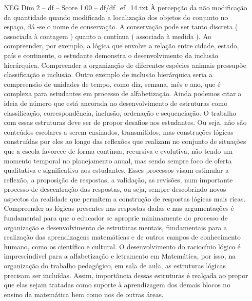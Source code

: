 \begin{textsample}{NEG Dim 2 – df – Score 1.00 – df/df\_ef\_14.txt}
À percepção da não modificação da quantidade quando modificada a localização dos objetos do conjunto no espaço, dá -se o nome de conservação.
A conservação pode ser tanto discreta ( associada à contagem ) quanto a contínua ( associada à medida ).
Ao compreender, por exemplo, a lógica que envolve a relação entre cidade, estado, país e continente, o estudante demonstra o desenvolvimento da inclusão hierárquica.
Compreender a organização de diferentes espécies animais pressupõe classificação e inclusão.
Outro exemplo de inclusão hierárquica seria a compreensão de unidades de tempo, como dia, semana, mês e ano, que é complexa para estudantes em processo de alfabetização.
Ainda podemos citar a ideia de número que está ancorada no desenvolvimento de estruturas como classificação, correspondência, inclusão, ordenação e sequenciação.
O trabalho com essas estruturas deve ser de propor desafios aos estudantes.
Ou seja, não são conteúdos escolares a serem ensinados, transmitidos, mas construções lógicas construídas por eles ao longo das reflexões que realizam no conjunto de situações que a escola favorece de forma contínua, recursiva e evolutiva, não tendo um momento temporal no planejamento anual, mas sendo sempre foco de oferta qualitativa e significativa aos estudantes.
Esses processos visam estimular a reflexão, a proposição de respostas, a validação, as revisões, num importante processo de descentração das respostas, ou seja, sempre descobrindo novos aspectos da realidade que permitem a construção de respostas lógicas mais ricas.
Compreender as lógicas presentes nas respostas dadas e nas argumentações é fundamental para que o educador se aproprie minimamente do processo de organização e desenvolvimento de estruturas mentais, fundamentais para a realização das aprendizagens matemáticas e de outros campos de conhecimento humano, como os científico e cultural.
O desenvolvimento do raciocínio lógico é imprescindível para a alfabetização e letramento em Matemática, por isso, na organização do trabalho pedagógico, em sala de aula, as estruturas lógicas precisam ser incluídas.
Assim, importância dessas estruturas é realçada ao propor que elas sejam tratadas como suporte à aprendizagem dos demais blocos no ensino da matemática bem como nos de outras áreas.

\end{textsample}
